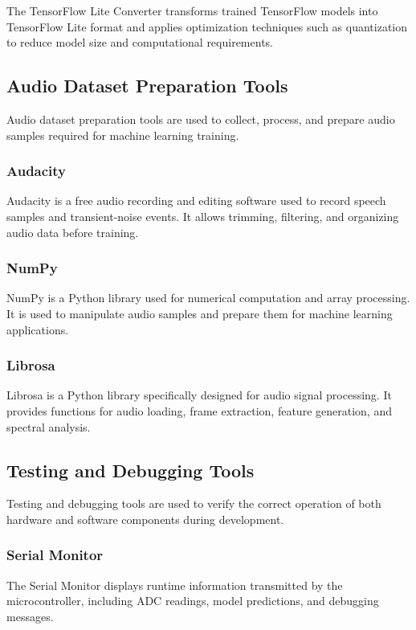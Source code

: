 The TensorFlow Lite Converter transforms trained TensorFlow models into TensorFlow Lite format and applies optimization techniques such as quantization to reduce model size and computational requirements.

\subsection{Audio Dataset Preparation Tools}
Audio dataset preparation tools are used to collect, process, and prepare audio samples required for machine learning training.

\subsubsection{Audacity}

Audacity is a free audio recording and editing software used to record speech samples and transient-noise events. It allows trimming, filtering, and organizing audio data before training.

\subsubsection{NumPy}

NumPy is a Python library used for numerical computation and array processing. It is used to manipulate audio samples and prepare them for machine learning applications.

\subsubsection{Librosa}

Librosa is a Python library specifically designed for audio signal processing. It provides functions for audio loading, frame extraction, feature generation, and spectral analysis.
\subsection{Testing and Debugging Tools}
Testing and debugging tools are used to verify the correct operation of both hardware and software components during development.

\subsubsection{Serial Monitor}

The Serial Monitor displays runtime information transmitted by the microcontroller, including ADC readings, model predictions, and debugging messages.

